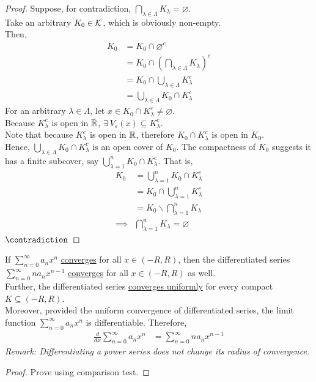 \documentclass[11pt]{article}
\begin{document}
 	\begin{proof}
 		Suppose, for contradiction, $\bigcap_{\lambda \in \Lambda} K_\lambda = \varnothing$. \\
 		Take an arbitrary $K_0 \in \mathcal{{K}}$, which is obviously non-empty. \\
 		Then,
 		\begin{align}
 			K_0 &= K_0 \cap \varnothing^c \\
 			&= K_0 \cap \left(\bigcap_{\lambda \in \Lambda} K_\lambda\right)^c \\
 			&= K_0 \cap \bigcup_{\lambda \in \Lambda} K_\lambda^c \\
 			&= \bigcup_{\lambda \in \Lambda} K_0 \cap K_\lambda^c
 		\end{align}
 		For an arbitrary $\lambda \in \Lambda$, let $x \in K_0 \cap K_\lambda^c \neq \varnothing$. \\
 		Because $K_\lambda^c$ is open in $\mathbb{R}$, $\exists\ V_\varepsilon(x) \subseteq K_\lambda^c$. \\
 		Note that because $K_\lambda^c$ is open in $\mathbb{R}$, therefore $K_0 \cap K_\lambda^c$ is open in $K_0$. \\
 		Hence, $\bigcup_{\lambda \in \Lambda} K_0 \cap K_\lambda^c$ is an open cover of $K_0$. The compactness of $K_0$ suggests it has a finite subcover, say $\bigcup_{\lambda=1}^n K_0 \cap K_\lambda^c$. That is,
 		\begin{align}
 			K_0 &= \bigcup_{\lambda=1}^n K_0 \cap K_\lambda^c \\
 			&= K_0 \cap \bigcup_{\lambda=1}^n K_\lambda^c \\
 			&= K_0 \backslash \bigcap_{\lambda=1}^n K_\lambda \\
 			\implies &\bigcap_{\lambda=1}^n K_\lambda = \varnothing
 		\end{align}
 		$\contradiction$
 	\end{proof}
 	
 	\begin{theorem}
 		If $\sum_{n=0}^\infty a_n x^n$ \ul{converges} for all $x \in (-R, R)$, then the differentiated series $\sum_{n=0}^\infty n a_n x^{n-1}$ \ul{converges} for all $x \in (-R, R)$ as well. \\
 		Further, the differentiated series \ul{converges uniformly} for every compact $K \subseteq (-R, R)$. \\
 		Moreover, provided the uniform convergence of differentiated series, the limit function $\sum_{n=0}^\infty a_n x^n$ is differentiable. Therefore,
 		\begin{align}
 			\frac{d}{dx} \sum_{n=0}^\infty a_n x^n &= \sum_{n=0}^\infty n a_n x^{n-1}
 		\end{align}
 		\emph{Remark: Differentiating a power series does not change its radius of convergence.}
 	\end{theorem}
 	
 	\begin{proof}
 		Prove using comparison test.
 	\end{proof}
\end{document}
